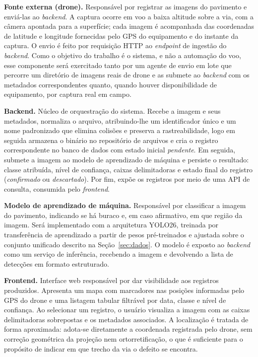\documentclass[12pt]{article}
\begin{document}
\textbf{Fonte externa (drone).} Responsável por registrar as imagens do
pavimento e enviá-las ao \emph{backend}. A captura ocorre em voo a baixa
altitude sobre a via, com a câmera apontada para a superfície; cada
imagem é acompanhada das coordenadas de latitude e longitude fornecidas
pelo GPS do equipamento e do instante da captura. O envio é feito por
requisição HTTP ao \emph{endpoint} de ingestão do \emph{backend}. Como o
objetivo do trabalho é o sistema, e não a automação do voo, esse
componente será exercitado tanto por um agente de envio em lote que
percorre um diretório de imagens reais de drone e as submete ao
\emph{backend} com os metadados correspondentes quanto, quando houver
disponibilidade de equipamento, por captura real em campo.

\textbf{Backend.} Núcleo de orquestração do sistema. Recebe a imagem e
seus metadados, normaliza o arquivo, atribuindo-lhe um identificador
único e um nome padronizado que elimina colisões e preserva a
rastreabilidade, logo em seguida armazena o binário no repositório de
arquivos e cria o registro correspondente no banco de dados com estado
inicial \emph{pendente}. Em seguida, submete a imagem ao modelo de
aprendizado de máquina e persiste o resultado: classe atribuída, nível de
confiança, caixas delimitadoras e estado final do registro
(\emph{confirmado} ou \emph{descartado}). Por fim, expõe os registros por
meio de uma API de consulta, consumida pelo \emph{frontend}.

\textbf{Modelo de aprendizado de máquina.} Responsável por classificar a
imagem do pavimento, indicando se há buraco e, em caso afirmativo, em que
região da imagem. Será implementado com a arquitetura YOLO26, treinada
por transferência de aprendizado a partir de pesos pré-treinados e
ajustada sobre o conjunto unificado descrito na
Seção~\ref{sec:dados}. O modelo é exposto ao \emph{backend} como um
serviço de inferência, recebendo a imagem e devolvendo a lista de
detecções em formato estruturado.

\textbf{Frontend.} Interface web responsável por dar visibilidade aos
registros produzidos. Apresenta um mapa com marcadores nas posições
informadas pelo GPS do drone e uma listagem tabular filtrável por data,
classe e nível de confiança. Ao selecionar um registro, o usuário
visualiza a imagem com as caixas delimitadoras sobrepostas e os metadados
associados. A localização é tratada de forma aproximada: adota-se
diretamente a coordenada registrada pelo drone, sem correção geométrica
da projeção nem ortorretificação, o que é suficiente para o propósito de
indicar em que trecho da via o defeito se encontra.
\end{document}
